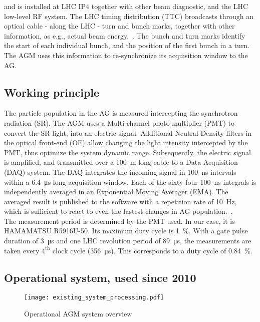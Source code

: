 %
and is installed at LHC IP4 together with other beam diagnostic, and the LHC low-level RF system.
%
The LHC timing distribution (TTC) broadcasts through an optical cable - along the LHC - turn and bunch marks, together with other information, as e.g., actual beam energy.~\cite{ttc_distribution}.
%
The bunch and turn marks identify the start of each individual bunch, and the position of the first bunch in a turn.   
%
The AGM uses this information to re-synchronize its acquisition window to the AG.
%
\subsection{Working principle}
%
The particle population in the AG is measured intercepting the synchrotron radiation (SR). 
%
The AGM uses a Multi-channel photo-multiplier (PMT) to convert the SR light, into an electric signal.
%
Additional Neutral Density filters in the optical front-end (OF) allow  changing the light intensity intercepted by the PMT, thus optimize the system dynamic range.
% 
Subsequently, the electric signal is amplified, and transmitted over a \SI{100}{m}-long cable to a Data Acquisition (DAQ) system.
%
The DAQ integrates the incoming signal in \SI{100}{\nano\second} intervals within a \SI{6.4}{\micro\second}-long acquisition window.
%
Each of the sixty-four \SI{100}{\nano\second} integrals is independently averaged in an Exponential Moving Averager (EMA).
%
The averaged result is published to the software with a repetition rate of 10~Hz, which is sufficient to react to even the fastest changes in AG population.~\cite{high_sensitivity_measurement}.
%
\\
The measurement period is determined by the PMT used.
%
In our case, it is HAMAMATSU R5916U-50. 
%
Its maximum duty cycle is \SI{1}{\%}. 
%
With a gate pulse duration of \SI{3}{\micro\second} and one LHC revolution period of \SI{89}{\micro\second}, the measurements are taken every $4^{\text{th}}$ clock cycle (\SI{356}{\micro\second}).
%
This corresponds to a duty cycle of \SI{0.84}{\%}.
\\
%

\subsection{Operational system, used since 2010}
\begin{figure}[!tbh]
    \centering
    \texttt{[image: existing\_system\_processing.pdf]}
    \caption{Operational AGM system overview}
    \label{fig:current_system_processing}
\end{figure}

